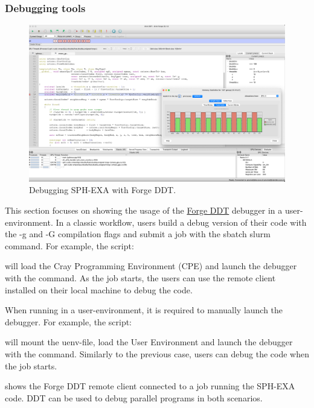 \subsubsection{Debugging tools}

\begin{figure}[htp!]
    \begin{center}
        \includegraphics[width=\textwidth]{./images/sph-ddt-uenv.png}
    \end{center}
    \caption{Debugging SPH-EXA with Forge DDT.}
    \label{fig:sph-ddt-uenv}
\end{figure}

This section focuses on showing the usage of the \href{https://www.linaroforge.com}{Forge DDT} debugger in a user-environment. 
In a classic workflow, users build a debug version of their code with the -g and -G compilation flags and submit a job with the sbatch slurm command.
For example, the  script:
%

%
will load the Cray Programming Environment (CPE) and launch the debugger with the  command.
As the job starts, the users can use the remote client installed on their local machine to debug the code.

When running in a user-environment, it is required to manually launch the debugger.
For example, the  script:
%

%
will mount the uenv-file, load the User Environment and launch the debugger with the  command.
Similarly to the previous case, users can debug the code when the job starts.

 shows the Forge DDT remote client connected to a job running the SPH-EXA code.
DDT can be used to debug parallel programs in both scenarios.

